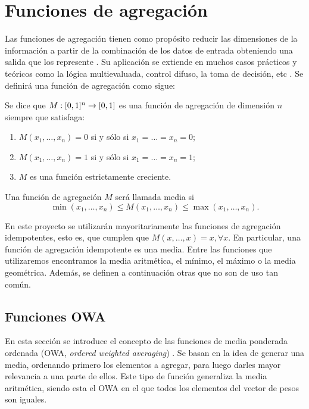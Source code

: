 \documentclass[main]{subfiles}
\begin{document}
\section{Funciones de agregación}\label{sec:agregacion}
Las funciones de agregación tienen como propósito reducir las dimensiones de la información a partir de la combinación de los datos de entrada obteniendo una salida que los represente \cite{art:montero, art:calvoagregacion}. Su aplicación se extiende en muchos casos prácticos y teóricos como la lógica multievaluada, control difuso, la toma de decisión, etc \cite{art:paternain}.  Se definirá una función de agregación como sigue:

\begin{definition}\label{def:agregacion}
Se dice que $M : [0,1]^n \rightarrow [0,1]$ es una función de agregación de dimensión $n$ siempre que satisfaga:
	\begin{enumerate}
	\item $M(x_1, \dots, x_n) = 0$ si y sólo si $x_1=\dots=x_n=0$;
	\item $M(x_1, \dots, x_n) = 1$ si y sólo si $x_1=\dots=x_n=1$;
	\item $M$ es una función estrictamente creciente.
	\end{enumerate}
\end{definition}
\begin{definition}
Una función de agregación $M$ será llamada media si
$$ \min(x_{1}, \dots, x_{n})  \leq M(x_{1}, \dots, x_{n}) \leq \max(x_{1}, \dots, x_{n}).$$
\end{definition}

En este proyecto se utilizarán mayoritariamente las funciones de agregación idempotentes, esto es, que cumplen que $M(x,\dots ,x)=x, \forall x$. En particular, una función de agregación idempotente es una media. Entre las funciones que utilizaremos encontramos la media aritmética, el mínimo, el máximo o la media geométrica. Además, se definen a continuación otras que no son de uso tan común.
\subsection{Funciones OWA}
En esta sección se introduce el concepto de las funciones de media ponderada ordenada (OWA, {\em  ordered weighted averaging}) \cite{art:yagerowa, art:paternain, art:bustinceowa}. Se basan en la idea de generar una media, ordenando primero los elementos a agregar, para luego darles mayor relevancia a una parte de ellos. Este tipo de función generaliza la media aritmética, siendo esta el OWA en el que todos los elementos del vector de pesos son iguales.
\end{document}
